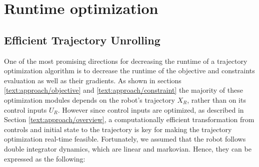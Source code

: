 

\section{Runtime optimization}
\label{text:approach/runtime}

\subsection{Efficient Trajectory Unrolling}
\label{text:approach/runtime/unrolling}
One of the most promising directions for decreasing the runtime of a trajectory optimization algorithm is to decrease the runtime of the objective and constraints evaluation as well as their gradients. As shown in sections \ref{text:approach/objective} and \ref{text:approach/constraint} the majority of these optimization modules depends on the robot's trajectory $X_R$, rather than on its control inputs $U_R$. However since control inputs are optimized, as described in Section \ref{text:approach/overview}, a computationally efficient transformation from controls and initial state to the trajectory is key for making the trajectory optimization real-time feasible.
\newline
Fortunately, we assumed that the robot follows double integrator dynamics, which are linear and markovian. Hence, they can be expressed as the following: 

